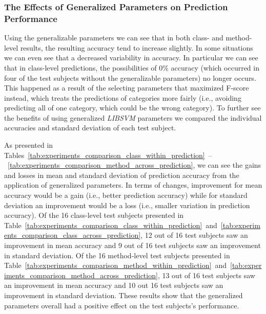 \subsubsection{The Effects of Generalized Parameters on Prediction Performance} 
\label{sububsec:comparison_prediction_performance_generalized}
Using the generalizable parameters we can see that in both class- and method-level results, the resulting accuracy tend to increase slightly. In some situations we can even see that a decreased variability in accuracy. In particular we can see that in class-level predictions, the possibilities of 0\% accuracy (which occurred in four of the test subjects without the generalizable parameters) no longer occurs. This happened as a result of the selecting parameters that maximized F-score instead, which treats the predictions of categories more fairly (i.e., avoiding predicting all of one category, which could be the wrong category). To further see the benefits of using generalized \emph{LIBSVM} parameters we compared the individual accuracies and standard deviation of each test subject.

As presented in Tables~\ref{tab:experiments_comparison_class_within_prediction}~--~\ref{tab:experiments_comparison_method_across_prediction}, we can see the gains and losses in mean and standard deviation of prediction accuracy from the application of generalized parameters. In terms of changes, improvement for mean accuracy would be a gain (i.e., better prediction accuracy) while for standard deviation an improvement would be a loss (i.e., smaller variation in prediction accuracy). Of the 16 class-level test subjects presented in Table~\ref{tab:experiments_comparison_class_within_prediction}~and~\ref{tab:experiments_comparison_class_across_prediction}, 12 out of 16 test subjects saw an improvement in mean accuracy and 9 out of 16 test subjects saw an improvement in standard deviation. Of the 16 method-level test subjects presented in Table~\ref{tab:experiments_comparison_method_within_prediction}~and~\ref{tab:experiments_comparison_method_across_prediction}, 13 out of 16 test subjects saw an improvement in mean accuracy and 10 out 16 test subjects saw an improvement in standard deviation. These results show that the generalized parameters overall had a positive effect on the test subjects's performance. 

